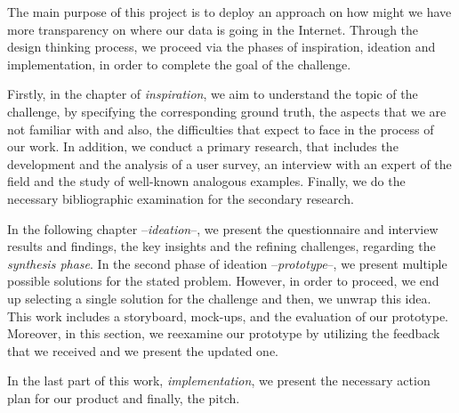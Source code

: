 The main purpose of this project is to deploy an approach on how might we have
more transparency on where our data is going in the Internet.  
Through the design thinking process, we proceed via the phases of inspiration, 
ideation and implementation, in order to complete the goal of the challenge.

Firstly, in the chapter of \emph{inspiration}, we aim to understand the topic of 
the challenge, by specifying the corresponding ground truth, the aspects that we 
are not familiar with and also, the difficulties that expect to face in the 
process of our work. In addition, we conduct a primary research, that includes 
the development and the analysis of a user survey, an interview with an expert 
of the field and the study of well-known analogous examples. Finally, we do the 
necessary bibliographic examination for the secondary research.

In the following chapter --\emph{ideation}--, we present the questionnaire and 
interview results and findings, the key insights and the refining challenges,
regarding the \emph{synthesis phase}. In the second phase of ideation 
--\emph{prototype}--, we present multiple possible solutions for the stated 
problem. However, in order to proceed, we end up selecting a single solution
for the challenge and then, we unwrap this idea. This work includes a storyboard,
mock-ups, and the evaluation of our prototype. Moreover, in this section, we 
reexamine our prototype by utilizing the feedback that we received and we present
the updated one. 

In the last part of this work, \emph{implementation}, we present the 
necessary action plan for our product and finally, the pitch.

